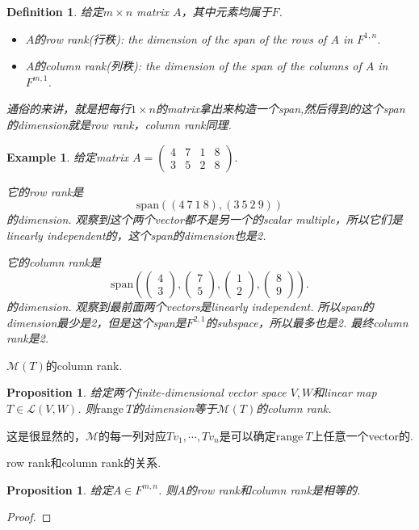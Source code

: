 \documentclass{article}
\newtheorem{proposition}[theorem]{Proposition}
\newtheorem{example}[theorem]{Example}
\newtheorem{definition}[theorem]{Definition}
\newcommand\range[1]{\text{range}\ #1}
\begin{document}
\begin{definition}
\rm 给定$m \times n$ matrix $A$，其中元素均属于$F$.
\begin{itemize}
	\item $A$的row rank(行秩): the dimension of the span of the rows of $A$ in $F^{1,n}$.
	\item $A$的column rank(列秩): the dimension of the span of the columns of $A$ in $F^{m,1}$.
\end{itemize}
通俗的来讲，就是把每行$1 \times n$的matrix拿出来构造一个span,然后得到的这个span的dimension就是row rank，column rank同理.
\end{definition}

\begin{example}
\rm 给定matrix $A=\begin{pmatrix} 4&7&1&8 \\ 3&5&2&8 \end{pmatrix}.$

它的row rank是
$$
\text{span}((4\ 7\ 1\ 8),(3\ 5\ 2\ 9))
$$
的dimension. 观察到这个两个vector都不是另一个的scalar multiple，所以它们是linearly independent的，这个span的dimension也是2.

它的column rank是
$$
\text{span}\left(\begin{pmatrix}4\\3\end{pmatrix},\begin{pmatrix}7\\5\end{pmatrix},\begin{pmatrix}1\\2\end{pmatrix},\begin{pmatrix}8\\9\end{pmatrix}\right).
$$
的dimension. 观察到最前面两个vectors是linearly independent. 所以span的dimension最少是2，但是这个span是$F^{2,1}$的subspace，所以最多也是2. 最终column rank是2.
\end{example}

{\color{red} $\mathcal{M}(T)$的column rank}.

\begin{proposition}
\rm 给定两个finite-dimensional vector space $V,W$和linear map $T \in \mathcal{L}(V,W)$. 则$\range{T}$的dimension等于$\mathcal{M}(T)$的column rank.
\end{proposition}

这是很显然的，$\mathcal{M}$的每一列对应$Tv_1,\cdots,Tv_n$是可以确定$\range{T}$上任意一个vector的.

{\color{red} row rank和column rank的关系}.
\begin{proposition}
\rm 给定$A \in F^{m,n}$. 则$A$的row rank和column rank是相等的.
\end{proposition}

\begin{proof}

\end{proof}
\end{document}
